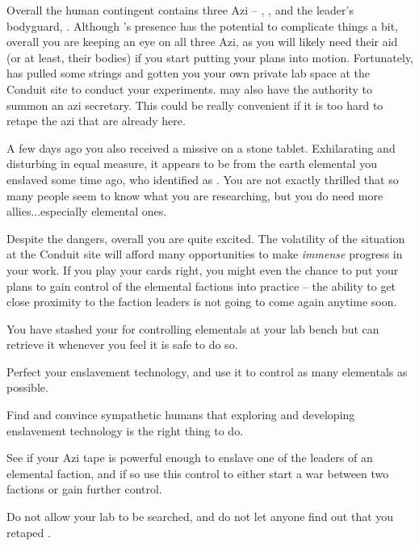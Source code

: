 \documentclass[char]{elementals}
\begin{document}
Overall the human contingent contains three Azi -- \cDiplomat{}, \cScientist{}, and the leader's bodyguard, \cRomeo{\intro}. Although \cDiplomat{}'s presence has the potential to complicate things a bit, overall you are keeping an eye on all three Azi, as you will likely need their aid (or at least, their bodies) if you start putting your plans into motion. Fortunately, \cDema{} has pulled some strings and gotten you your own private lab space at the Conduit site to conduct your experiments. \cDema{} may also have the authority to summon an azi secretary. This could be really convenient if it is too hard to retape the azi that are already here.

A few days ago you also received a missive on a stone tablet. Exhilarating and disturbing in equal measure, it appears to be from the earth elemental you enslaved some time ago, who identified \cMinion{\themself} as \cMinion{\intro}. You are not exactly thrilled that so many people seem to know what you are researching, but you do need more allies...especially elemental ones.

Despite the dangers, overall you are quite excited. The volatility of the situation at the Conduit site will afford many opportunities to make \emph{immense} progress in your work. If you play your cards right, you might even the chance to put your plans to gain control of the elemental factions into practice -- the ability to get close proximity to the faction leaders is not going to come again anytime soon.

\begin{itemz}[Notes]
\item You have stashed your \iControlRod{} for controlling elementals at your lab bench but can retrieve it whenever you feel it is safe to do so.
\end{itemz}

\begin{itemz}[Goals]
  \item Perfect your enslavement technology, and use it to control as many elementals as possible.
  \item Find and convince sympathetic humans that exploring and developing enslavement technology is the right thing to do.
  \item See if your Azi tape is powerful enough to enslave one of the leaders of an elemental faction, and if so use this control to either start a war between two factions or gain further control.
  \item Do not allow your lab to be searched, and do not let anyone find out that you retaped \cDiplomat{}.
\end{itemz}
\end{document}
